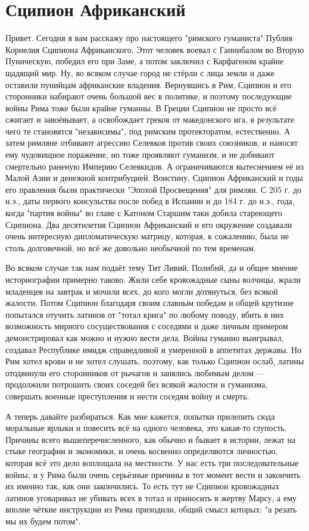 \chapter{Сципион Африканский}


Привет. Сегодня я вам расскажу про настоящего "римского гуманиста" Публия Корнелия Сципиона Африканского. Этот человек воевал с Ганнибалом во Вторую Пуническую, победил его при Заме, а потом заключил с Карфагеном крайне щадящий мир. Ну, во всяком случае город не стёрли с лица земли и даже оставили пунийцам африканские владения. Вернувшись в Рим, Сципион и его сторонники набирают очень большой вес в политике, и поэтому последующие войны Рима тоже были крайне гуманны. В Греции Сципион не просто всё сжигает и завоёвывает, а освобождает греков от македонского ига, в результате чего те становятся "независимы", под римским протекторатом, естественно. А затем римляне отбивают агрессию Селевков против своих союзников, и наносят ему чудовищное поражение, но тоже проявляют гуманизм, и не добивают смертельно раненую Империю Селевкидов. А ограничиваются вытеснением её из Малой Азии и денежной контрибуцией. Воистину, Сципион Африканский и годы его правления были практически "Эпохой Просвещения" для римлян. С 205 г. до н.э., даты первого консульства после побед в Испании и до 184 г. до н.э., года, когда "партия войны" во главе с Катоном Старшим таки добила стареющего Сципиона. Два десятилетия Сципион Африканский и его окружение создавали очень интересную дипломатическую матрицу, которая, к сожалению, была не столь долговечной, но всё же довольно необычной по тем временам.


Во всяком случае так нам подаёт тему Тит Ливий, Полибий, да и общее мнение историографии примерно таково. Жили себе кровожадные сыны волчицы, жрали младенцев на завтрак и мочили всех, до кого могли дотянуться, без всякой жалости. Потом Сципион благодаря своим славным победам и общей крутизне попытался отучить латинов от "тотал крига" по любому поводу, вбить в них возможность мирного сосуществования с соседями и даже личным примером демонстрировал как можно и нужно вести дела. Войны гуманно выигрывал, создавал Республике имидж справедливой и умеренной в аппетитах державы. Но Рим хотел крови и не хотел слушать, поэтому, как только Сципион ослаб, латины отодвинули его сторонников от рычагов и занялись любимым делом — продолжили потрошить своих соседей без всякой жалости и гуманизма, совершать военные преступления и нести соседям войну и смерть.

А теперь давайте разбираться. Как мне кажется, попытки прилепить сюда моральные ярлыки и повесить всё на одного человека, это какая-то глупость. Причины всего вышеперечисленного, как обычно и бывает в истории, лежат на стыке географии и экономики, и очень косвенно определяются личностью, которая всё это дело воплощала на местности. У нас есть три последовательные войны, и у Рима были очень серьёзные причины в тот момент вести и закончить их именно так, как они закончились. То есть тут не Сципион кровожадных латинов уговаривал не убивать всех в тотал и приносить в жертву Марсу, а ему вполне чёткие инструкции из Рима приходили, общий смысл которых: "а резать мы их будем потом".

